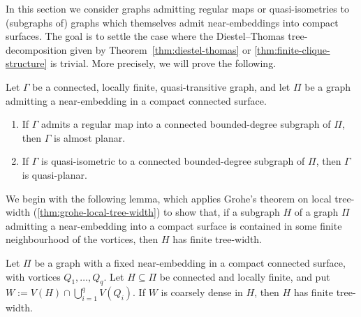 \documentclass[a4paper]{amsart}
\begin{document}
In this section we consider graphs admitting regular maps or quasi-isometries to (subgraphs of) graphs which themselves admit near-embeddings into compact surfaces. The goal is to settle the case where the Diestel--Thomas tree-decomposition given by Theorem~\ref{thm:diestel-thomas} or \ref{thm:finite-clique-structure} is trivial. More precisely, we will prove the following. 

\begin{theorem}\label{thm:escaping-vortex}
Let $\Gamma$ be a connected, locally finite, quasi-transitive graph, and let $\Pi$ be a graph admitting a near-embedding in a compact connected surface.
\begin{enumerate}
\item If $\Gamma$ admits a regular map into a connected bounded-degree subgraph of $\Pi$, then $\Gamma$ is almost planar.
\item If $\Gamma$ is quasi-isometric to a connected bounded-degree subgraph of $\Pi$, then $\Gamma$ is quasi-planar. 
\end{enumerate}
\end{theorem}


We begin with the following lemma, which applies Grohe's theorem on local tree-width (\ref{thm:grohe-local-tree-width}) to show that, if a subgraph $H$ of a graph $\Pi$  admitting a near-embedding into a compact surface is contained in some finite neighbourhood of the vortices, then $H$ has finite tree-width. 


\begin{lemma}\label{lem:dense-vortex-tree-width}
Let $\Pi$ be a graph with a fixed near-embedding in a compact connected surface, with vortices $Q_1,\ldots,Q_q$. Let $H\subseteq\Pi$ be connected and locally finite, and put $W:=V(H)\cap\bigcup_{i=1}^q V(Q_i)$. If $W$ is coarsely dense in $H$, then $H$ has finite tree-width.
\end{lemma}
\end{document}
